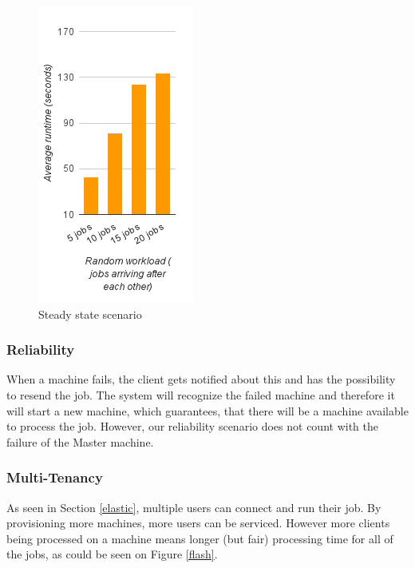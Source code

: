 \begin{figure}
 \centering

 \includegraphics{random-graph}
 \caption{Steady state scenario}
  \label{steady}
\end{figure}

\subsubsection{Reliability}
When a machine fails, the client gets notified about this and has the possibility to resend the job. The system will recognize the failed machine and therefore it will start a new machine, which guarantees, that there will be a machine available to process the job. However, our reliability scenario does not count with the failure of the Master machine.

\subsubsection{Multi-Tenancy}
As seen in Section \ref{elastic}, multiple users can connect and run their job. By provisioning more machines, more users can be serviced. However more clients being processed on a machine means longer (but fair) processing time for all of the jobs, as could be seen on Figure \ref{flash}.